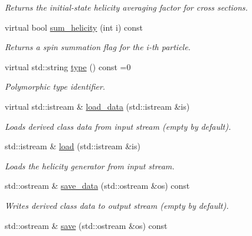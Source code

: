\begin{DoxyCompactItemize}
\begin{DoxyCompactList}\small\item\em Returns the initial-\/state helicity averaging factor for cross sections. \end{DoxyCompactList}\item 
virtual bool \hyperlink{a00268_a5f9ad2e7ec5147c174578f659434cefa}{sum\-\_\-helicity} (int i) const 
\begin{DoxyCompactList}\small\item\em Returns a spin summation flag for the i-\/th particle. \end{DoxyCompactList}\item 
\hypertarget{a00268_af336a7c7169989fb48adc1e6587c8b15}{virtual std\-::string \hyperlink{a00268_af336a7c7169989fb48adc1e6587c8b15}{type} () const =0}\label{a00268_af336a7c7169989fb48adc1e6587c8b15}

\begin{DoxyCompactList}\small\item\em Polymorphic type identifier. \end{DoxyCompactList}\item 
\hypertarget{a00268_a8fd4f7b757286b1f14cb9432fa2acb51}{virtual std\-::istream \& \hyperlink{a00268_a8fd4f7b757286b1f14cb9432fa2acb51}{load\-\_\-data} (std\-::istream \&is)}\label{a00268_a8fd4f7b757286b1f14cb9432fa2acb51}

\begin{DoxyCompactList}\small\item\em Loads derived class data from input stream (empty by default). \end{DoxyCompactList}\item 
\hypertarget{a00268_ace05dc0a9762bd8f76f6109f7137997a}{std\-::istream \& \hyperlink{a00268_ace05dc0a9762bd8f76f6109f7137997a}{load} (std\-::istream \&is)}\label{a00268_ace05dc0a9762bd8f76f6109f7137997a}

\begin{DoxyCompactList}\small\item\em Loads the helicity generator from input stream. \end{DoxyCompactList}\item 
\hypertarget{a00268_a636ef29f29c534fffbf437936a71fabc}{std\-::ostream \& \hyperlink{a00268_a636ef29f29c534fffbf437936a71fabc}{save\-\_\-data} (std\-::ostream \&os) const }\label{a00268_a636ef29f29c534fffbf437936a71fabc}

\begin{DoxyCompactList}\small\item\em Writes derived class data to output stream (empty by default). \end{DoxyCompactList}\item 
\hypertarget{a00268_a1a4598e0c26c907e43b52ca7ad82b1b8}{std\-::ostream \& \hyperlink{a00268_a1a4598e0c26c907e43b52ca7ad82b1b8}{save} (std\-::ostream \&os) const }\label{a00268_a1a4598e0c26c907e43b52ca7ad82b1b8}


\end{DoxyCompactItemize}

